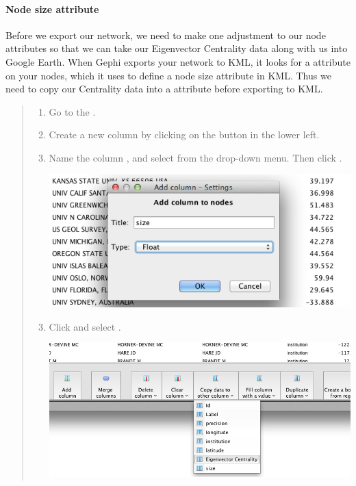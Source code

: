 \documentclass[letterpaper,10pt,english]{sphinxmanual}
\begin{document}
\paragraph{Node size attribute}
\label{tutorial.geonetworks:node-size-attribute}
Before we export our network, we need to make one adjustment to our node attributes so
that we can take our Eigenvector Centrality data along with us into Google Earth. When
Gephi exports your network to KML, it looks for a  attribute on your nodes, which
it uses to define a node size attribute in KML. Thus we need to copy our Centrality data
into a  attribute before exporting to KML.
\begin{quote}
\begin{enumerate}
\item {} 
Go to the .

\item {} 
Create a new column by clicking on the  button in the lower left.

\item {} 
Name the column , and select  from the  drop-down menu.
Then click .

{\hfill\includegraphics{geo6.png}\hfill}

\end{enumerate}
\begin{enumerate}
\setcounter{enumi}{2}
\item {} 
Click  and select .

{\hfill\includegraphics{geo7.png}\hfill}


\end{enumerate}
\end{quote}
\end{document}
